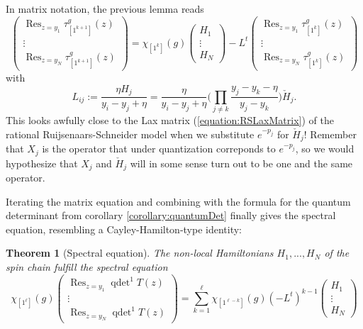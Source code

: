 \documentclass[11pt]{report}
\newtheorem{theorem}{Theorem}[section]
\theoremstyle{definition}
\theoremstyle{remark}
\theoremstyle{remark}
\begin{document}
In matrix notation, the previous lemma reads
\begin{equation*}
\begin{pmatrix}
\operatorname{Res}_{z=y_1} \tau_{[1^{k+1}]}^g(z) \\
\vdots \\
\operatorname{Res}_{z=y_N} \tau_{[1^{k+1}]}^g(z)
\end{pmatrix}
=
\chi_{[1^k]}(g)
\begin{pmatrix}
H_1 \\
\vdots \\
H_N
\end{pmatrix}
-L^t
\begin{pmatrix}
\operatorname{Res}_{z=y_1} \tau_{[1^k]}^g(z) \\
\vdots \\
\operatorname{Res}_{z=y_N} \tau_{[1^k]}^g(z)
\end{pmatrix}
\end{equation*}
with
\begin{equation*}
L_{ij} := \frac{\eta H_j}{y_i-y_j+\eta} = \frac{\eta}{y_i-y_j+\eta} \bigg( \prod_{j \neq k} \frac{y_j-y_k-\eta}{y_j-y_k} \bigg) \check H_j.
\end{equation*}
This looks awfully close to the Lax matrix (\ref{equation:RSLaxMatrix}) of the rational Ruijsenaars-Schneider model when we substitute $e^{-p_j}$ for $\check H_j$! Remember that $X_j$ is the operator that under quantization correponds to $e^{-p_j}$, so we would hypothesize that $X_j$ and $\check H_j$ will in some sense turn out to be one and the same operator.

Iterating the matrix equation and combining with the formula for the quantum determinant from corollary \ref{corollary:quantumDet} finally gives the spectral equation, resembling a Cayley-Hamilton-type identity:

\begin{theorem}[Spectral equation]\label{theorem:spectralEq}
The non-local Hamiltonians $H_1,...,H_N$ of the spin chain fulfill the \emph{spectral equation}
\begin{equation*}
\chi_{[1^\ell]}(g)
\begin{pmatrix}
\operatorname{Res}_{z=y_1} \operatorname{qdet}^1 T(z) \\ \vdots \\ \operatorname{Res}_{z=y_N} \operatorname{qdet}^1 T(z)
\end{pmatrix}
= \sum_{k=1}^\ell \chi_{[1^{\ell-k}]}(g) (-L^t)^{k-1}
\begin{pmatrix}
H_1 \\ \vdots \\ H_N
\end{pmatrix}
\end{equation*}
\end{theorem}
\end{document}
